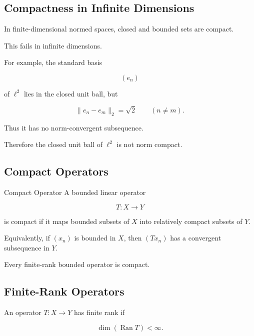 \subsection{Compactness in Infinite Dimensions}
\label{subsec:compactness-infinite-dimensional}

In finite-dimensional normed spaces, closed and bounded sets are compact.

This fails in infinite dimensions.

For example, the standard basis

\[
(e_n)
\]

of \(\ell^2\) lies in the closed unit ball, but

\[
\|e_n-e_m\|_2
=
\sqrt{2}
\qquad
(n\neq m).
\]

Thus it has no norm-convergent subsequence.

Therefore the closed unit ball of \(\ell^2\) is not norm compact.

\subsection{Compact Operators}
\label{subsec:compact-operators}

\begin{definitionbox}{Compact Operator}
A bounded linear operator

\[
T:X\to Y
\]

is compact if it maps bounded subsets of \(X\) into relatively compact
subsets of \(Y\).
\end{definitionbox}

Equivalently, if \((x_n)\) is bounded in \(X\), then \((Tx_n)\) has a
convergent subsequence in \(Y\).

Every finite-rank bounded operator is compact.

\subsection{Finite-Rank Operators}
\label{subsec:finite-rank-operators}

An operator \(T:X\to Y\) has finite rank if

\[
\boxed{
\dim(\operatorname{Ran}T)<\infty.
}
\]

